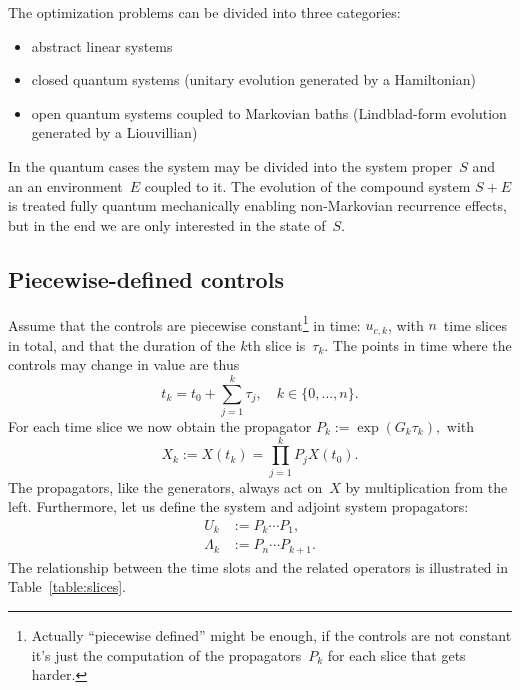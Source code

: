 \documentclass[aps, pra, a4paper, longbibliography, superscriptaddress]{revtex4-1}
\newcommand{\be}{\begin{equation}}
\newcommand{\ee}{\end{equation}}
\begin{document}
The optimization problems can be divided into three categories:
\begin{itemize}
\item
abstract linear systems
\item
closed quantum systems (unitary evolution generated by a Hamiltonian)
\item
open quantum systems coupled to Markovian baths (Lindblad-form
evolution generated by a Liouvillian)
\end{itemize}
In the quantum cases the system may be divided into the system
proper~$S$ and an an environment~$E$ coupled to it.
The evolution of the compound system $S+E$ is treated
fully quantum mechanically enabling non-Markovian recurrence effects,
but in the end we are only interested in the state of~$S$.



\subsection{Piecewise-defined controls}

Assume that the controls are
piecewise constant\footnote{Actually ``piecewise defined'' might be
  enough, if the controls are not constant it's just the computation
  of the propagators~$P_k$ for each slice that gets harder.}
in time: $u_{c, k}$, with $n$~time slices in total,
and that the duration of the $k$th slice is~$\tau_k$.
The points in time where the controls may change in value are thus
\be
t_k = t_0 + \sum_{j=1}^{k} \tau_j, \quad k \in \{0, \ldots, n\}.
\ee
For each time slice we now obtain the propagator
$
P_k := \exp(G_k \tau_k),
$
with
\be
\label{eq:Xn}
X_k := X(t_k) = \prod_{j=1}^{k} P_j X(t_0).
\ee
The propagators, like the generators, always act on~$X$ by multiplication
from the left.
Furthermore, let us define the system and adjoint system propagators:
\begin{align}
U_k &:= P_k \cdots P_1,\\      %
\Lambda_k &:= P_n \cdots P_{k+1}.
\end{align}
The relationship between the time slots and the related operators is
illustrated in Table~\ref{table:slices}.
\end{document}
